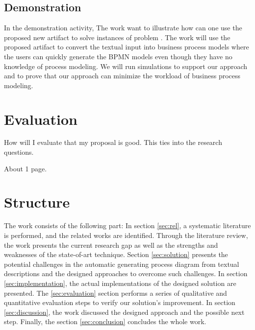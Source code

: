 \subsection{Demonstration}
In the demonstration activity, The work want to illustrate how can one use the proposed new artifact to solve instances of problem \cite{DSM_3}. The work will use the proposed artifact to convert the textual input into business process models where the users can quickly generate the BPMN models even though they have no knowledge of process modeling. We will run simulations to support our approach and to prove that our approach can minimize the workload of business process modeling.

\section{Evaluation}
\label{sec:intro:ev}
How will I evaluate that my proposal is good. This ties into the research questions.

About 1 page.

\section{Structure}
\label{sec:intro:struct}
The work consists of the following part: In section \ref{sec:rel}, a systematic literature is performed, and the related works are identified. Through the literature review, the work presents the current research gap as well as the strengths and weaknesses of the state-of-art technique. Section \ref{sec:solution} presents the potential challenges in the automatic generating process diagram from textual descriptions and the designed approaches to overcome such challenges. In section \ref{sec:implementation}, the actual implementations of the designed solution are presented. The \ref{sec:evaluation} section performs a series of qualitative and quantitative evaluation steps to verify our solution's improvement. In section \ref{sec:discussion}, the work discussed the designed approach and the possible next step. Finally, the section \ref{sec:conclusion} concludes the whole work.


